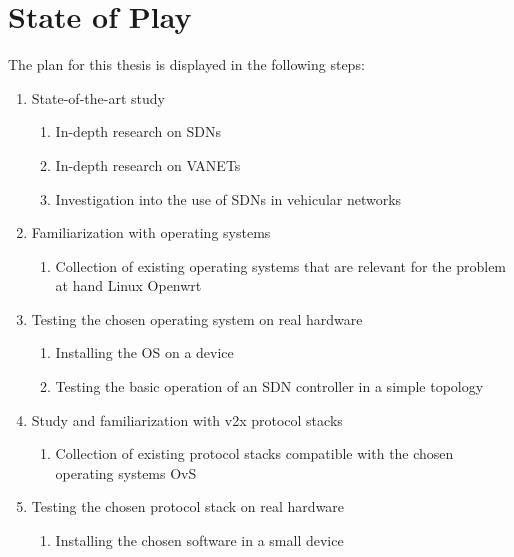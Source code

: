 \chapter{State of Play}
\label{cha:state_of_play}


The plan for this thesis is displayed in the following steps:

\begin{enumerate}
    \item State-of-the-art study
    \begin{enumerate}
        \item In-depth research on SDNs 
        \item In-depth research on VANETs
        \item Investigation into the use of SDNs in vehicular networks
    \end{enumerate}
    \item Familiarization with operating systems 
    \begin{enumerate}
        \item Collection of existing operating systems that are relevant for the problem at hand 
        Linux
        Openwrt
    \end{enumerate}
    \item Testing the chosen operating system on real hardware
    \begin{enumerate}
        \item Installing the OS on a device
        \item Testing the basic operation of an SDN controller in a simple topology
    \end{enumerate}
    \item Study and familiarization with v2x protocol stacks
    \begin{enumerate}
        \item Collection of existing protocol stacks compatible with the chosen operating systems
        OvS
    \end{enumerate}
    \item Testing the chosen protocol stack on real hardware
    \begin{enumerate}
        \item Installing the chosen software in a small device

\end{enumerate}
\end{enumerate}
